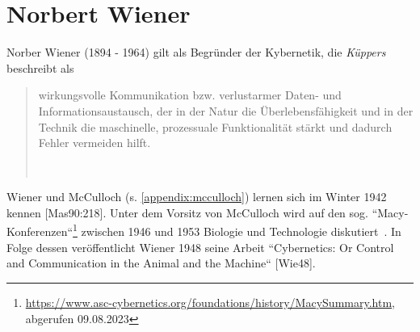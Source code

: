 \section{Norbert Wiener}\label{appendix:wiener}

Norber Wiener (1894 - 1964) gilt als Begründer der Kybernetik, die \textit{Küppers} beschreibt als

\blockquote[{~\cite[2]{Kup19}}]{
    wirkungsvolle Kommunikation bzw. verlustarmer Daten- und Informationsaustausch, der in der Natur die Überlebensfähigkeit und in der Technik die maschinelle, prozessuale Funktionalität stärkt und dadurch Fehler vermeiden hilft.
}

Wiener und McCulloch (s. \ref{appendix:mcculloch}) lernen sich im Winter 1942 kennen [Mas90:218].
Unter dem Vorsitz von McCulloch wird auf den sog. ``Macy-Konferenzen``\footnote{
    \url{https://www.asc-cybernetics.org/foundations/history/MacySummary.htm}, abgerufen 09.08.2023
} zwischen 1946 und 1953 Biologie und Technologie diskutiert~\cite[5]{Arb19}.
In Folge dessen veröffentlicht Wiener 1948 seine Arbeit ``Cybernetics: Or Control and Communication in the Animal and the Machine`` [Wie48].